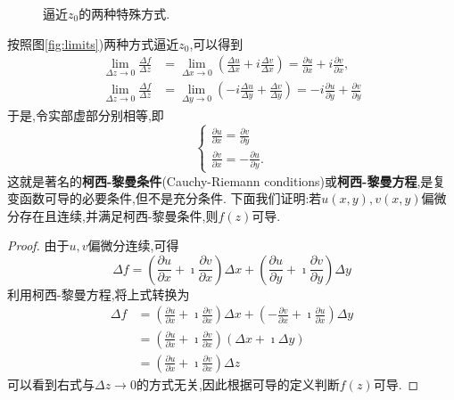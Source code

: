 \begin{figure}
    \centering
    
    \caption{逼近$z_0$的两种特殊方式.}
    \label{fig:limits}
\end{figure}
按照图\eqref{fig:limits})两种方式逼近$z_0$,可以得到
\begin{align}
    \lim _{\Delta z \rightarrow 0} \frac{\Delta f}{\Delta z} &=\lim _{\Delta x \rightarrow 0}\left(\frac{\Delta u}{\Delta x}+i \frac{\Delta v}{\Delta x}\right)=\frac{\partial u}{\partial x}+i \frac{\partial v}{\partial x},
\\
    \lim _{\Delta z \rightarrow 0} \frac{\Delta f}{\Delta z} &=\lim _{\Delta y \rightarrow 0}\left(-i \frac{\Delta u}{\Delta y}+\frac{\Delta v}{\Delta y}\right)=-i \frac{\partial u}{\partial y}+\frac{\partial v}{\partial y}
\end{align}
于是,令实部虚部分别相等,即
\begin{equation}
    \begin{cases}
        \frac{\partial u}{\partial x}=\frac{\partial v}{\partial y} \\
        \frac{\partial v}{\partial x}=-\frac{\partial u}{\partial y} .
    \end{cases}
\end{equation}
这就是著名的{\bf 柯西-黎曼条件}(Cauchy-Riemann conditions)或{\bf 柯西-黎曼方程},是复变函数可导的必要条件,但不是充分条件.
下面我们证明:若$u(x,y), v(x,y)$偏微分存在且连续,并满足柯西-黎曼条件,则$f(z)$可导.
\begin{proof}
    由于$u,v$偏微分连续,可得
    \[
        \Delta f=\left(\frac{\partial u}{\partial x}+\imath \frac{\partial v}{\partial x}\right) \Delta x+\left(\frac{\partial u}{\partial y}+ \imath \frac{\partial v}{\partial y}\right) \Delta y
    \]
    利用柯西-黎曼方程,将上式转换为
    \[
        \begin{aligned}
        \Delta f & =\left(\frac{\partial u}{\partial x}+ \imath \frac{\partial v}{\partial x}\right) \Delta x+\left(-\frac{\partial v}{\partial x}+ \imath\frac{\partial u}{\partial x}\right) \Delta y \\
        & =\left(\frac{\partial u}{\partial x}+ \imath \frac{\partial v}{\partial x}\right)(\Delta x+ \imath \Delta y) 
        \\
        & = \left(\frac{\partial u}{\partial x}+ \imath \frac{\partial v}{\partial x}\right) \Delta z
        \end{aligned}
    \]
可以看到右式与$\Delta z\to 0$的方式无关,因此根据可导的定义判断$f(z)$可导.
\end{proof}
